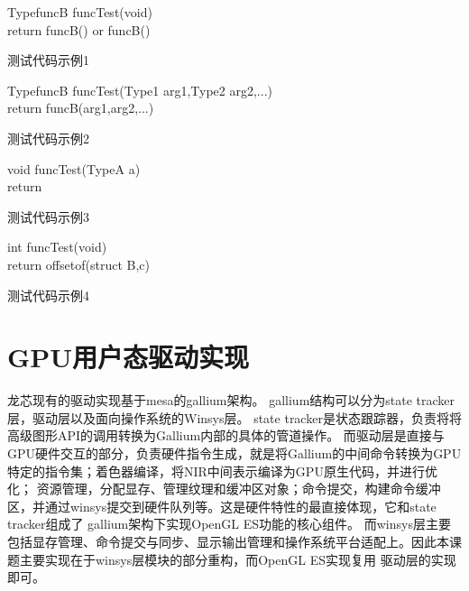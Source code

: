 \begin{minipage}{0.45\textwidth}
  \begin{algorithm}[H]
    \SetAlgoLined
    TypefuncB funcTest(void){\\
      return funcB()\;
        or \;
      funcB()\;
    }
    \caption{测试代码示例1}
    \label{algo:algorithm2}
  \end{algorithm}
\end{minipage}
\hfill
\begin{minipage}{0.45\textwidth}
  \begin{algorithm}[H]
    \SetAlgoLined
    TypefuncB funcTest(Type1 arg1,Type2 arg2,...){\\
      return funcB(arg1,arg2,...)\;
    }
    \caption{测试代码示例2}
    \label{algo:algorithm3}
  \end{algorithm}
\end{minipage}

\begin{minipage}{0.45\textwidth}
  \begin{algorithm}[H]
    \SetAlgoLined
    void funcTest(TypeA a){\\
      return \;
    }
    \caption{测试代码示例3}
    \label{algo:algorithm4}
  \end{algorithm}
\end{minipage}
\hfill
\begin{minipage}{0.45\textwidth}
  \begin{algorithm}[H]
    \SetAlgoLined
    int funcTest(void){\\
      return offsetof(struct B,c) \;
    }
    \caption{测试代码示例4}
    \label{algo:algorithm5}
  \end{algorithm}
\end{minipage}


\section{GPU用户态驱动实现}

龙芯现有的驱动实现基于mesa的gallium架构。
gallium结构可以分为state tracker层，驱动层以及面向操作系统的Winsys层。
state tracker是状态跟踪器，负责将将高级图形API的调用转换为Gallium内部的具体的管道操作。
而驱动层是直接与GPU硬件交互的部分，负责硬件指令生成，就是将Gallium的中间命令转换为GPU特定的指令集；着色器编译，将NIR中间表示编译为GPU原生代码，并进行优化；
资源管理，分配显存、管理纹理和缓冲区对象；命令提交，构建命令缓冲区，并通过winsys提交到硬件队列等。这是硬件特性的最直接体现，它和state tracker组成了
gallium架构下实现OpenGL ES功能的核心组件。
而winsys层主要包括显存管理、命令提交与同步、显示输出管理和操作系统平台适配上。因此本课题主要实现在于winsys层模块的部分重构，而OpenGL ES实现复用
驱动层的实现即可。

